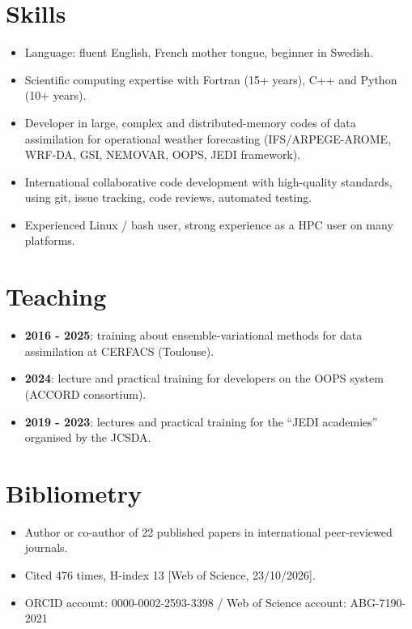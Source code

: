 \documentclass[a4paper,9pt]{scrreprt}
\begin{document}
\section*{Skills}
\begin{itemize}
\item Language: fluent English, French mother tongue, beginner in Swedish.\vspace{-0.12cm}
\item Scientific computing expertise with Fortran (15+ years), C++ and Python (10+ years).\vspace{-0.12cm}
\item Developer in large, complex and distributed-memory codes of data assimilation for operational weather forecasting (IFS/ARPEGE-AROME, WRF-DA, GSI, NEMOVAR, OOPS, JEDI framework).\vspace{-0.12cm}
\item International collaborative code development with high-quality standards, using git, issue tracking, code reviews, automated testing.\vspace{-0.12cm}
\item Experienced Linux / bash user, strong experience as a HPC user on many platforms.\vspace{-0.12cm}
\end{itemize}

\section*{Teaching}
\begin{itemize}
\item \textbf{2016 - 2025}: training about ensemble-variational methods for data assimilation at CERFACS (Toulouse).\vspace{-0.12cm}
\item \textbf{2024}: lecture and practical training for developers on the OOPS system (ACCORD consortium).\vspace{-0.12cm}
\item \textbf{2019 - 2023}: lectures and practical training for the ``JEDI academies'' organised by the JCSDA.\vspace{-0.12cm}
\end{itemize}

\section*{Bibliometry}
\begin{itemize}
\item Author or co-author of 22 published papers in international peer-reviewed journals.\vspace{-0.12cm}
\item Cited 476 times, H-index 13 [Web of Science, 23/10/2026].\vspace{-0.12cm}
\item ORCID account: 0000-0002-2593-3398 / Web of Science account: ABG-7190-2021
\end{itemize}
\end{document}
